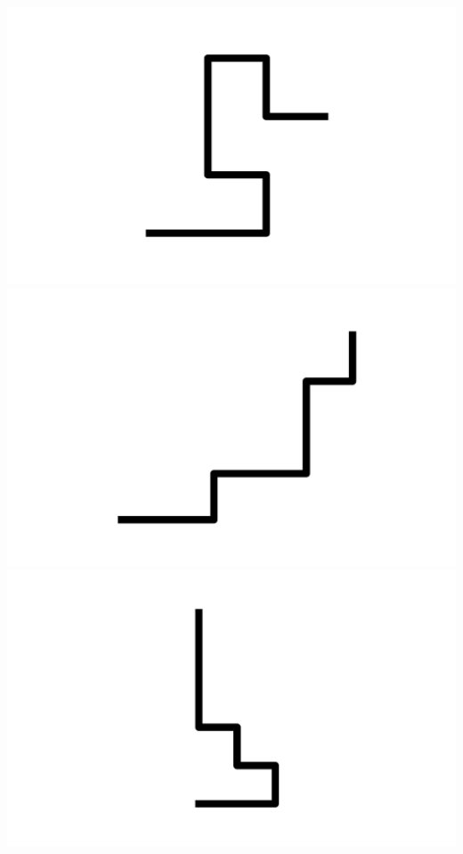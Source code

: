 \documentclass[]{report}
\begin{document}
\includegraphics[scale=.1]{pictures/21/state_cluster_shapes_343.pdf} 
\includegraphics[scale=.1]{pictures/21/state_cluster_shapes_344.pdf} 
\includegraphics[scale=.1]{pictures/21/state_cluster_shapes_345.pdf} 
\end{document}
